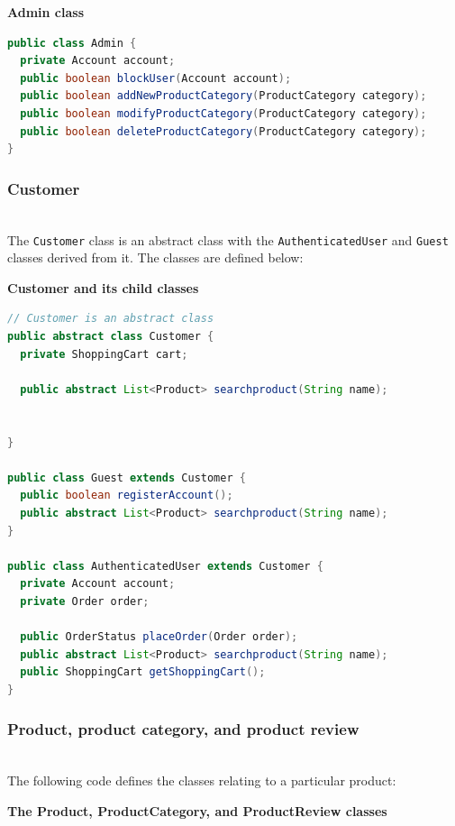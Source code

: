 \textbf{Admin class}

\begin{lstlisting}[language=Java]
public class Admin {
  private Account account;
  public boolean blockUser(Account account);
  public boolean addNewProductCategory(ProductCategory category);
  public boolean modifyProductCategory(ProductCategory category);
  public boolean deleteProductCategory(ProductCategory category);
}
\end{lstlisting}

\subsubsection{Customer}\label{KcbwE9F21HX5kQsBlPvQF}
\\
The \texttt{Customer} class is an abstract class with the \texttt{AuthenticatedUser} and \texttt{Guest} classes derived from it. The classes are defined below:

\textbf{Customer and its child classes}

\begin{lstlisting}[language=Java]
// Customer is an abstract class
public abstract class Customer {
  private ShoppingCart cart;
  
  public abstract List<Product> searchproduct(String name);
  
  
}

public class Guest extends Customer {
  public boolean registerAccount();
  public abstract List<Product> searchproduct(String name);
}

public class AuthenticatedUser extends Customer {
  private Account account;
  private Order order;
  
  public OrderStatus placeOrder(Order order);
  public abstract List<Product> searchproduct(String name);
  public ShoppingCart getShoppingCart();
}
\end{lstlisting}

\subsubsection{Product, product category, and product review}\label{BVr3iVSKEF-uu4yWhpAAa}
\\
The following code defines the classes relating to a particular product:

\textbf{The Product, ProductCategory, and ProductReview classes}

